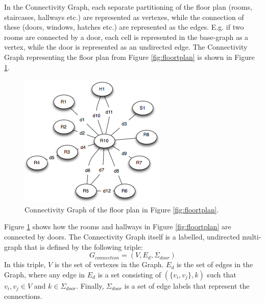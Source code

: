 In the Connectivity Graph, each separate partitioning of the floor plan (rooms, staircases, hallways etc.) are represented as vertexes, while the connection of these (doors, windows, hatches etc.) are represented as the edges.
E.g. if two rooms are connected by a door, each cell is represented in the base-graph as a vertex, while the door is represented as an undirected edge. 
The Connectivity Graph representing the floor plan from Figure \ref{fig:floortplan} is shown in Figure \ref{fig:connectivitygraph}. 
\begin{figure}[]%
\centering
\includegraphics[width=0.8\columnwidth]{images/connectivitygraph.png}%
\caption{Connectivity Graph of the floor plan in Figure \ref{fig:floortplan}.}%
\label{fig:connectivitygraph}%
\end{figure}%
Figure \ref{fig:connectivitygraph} shows how the rooms and hallways in Figure \ref{fig:floortplan} are connected by doors. 
The Connectivity Graph itself is a labelled, undirected multi-graph that is defined by the following triple: \\
\begin{equation}
G_{connection} = (V, E_d, \Sigma_{door})
\end{equation}
In this triple, $V$ is the set of vertexes in the Graph. 
$E_d$ is the set of edges in the Graph, where any edge in $E_d$ is a set consisting of $(\{v_i, v_j\}, k)$ such that $v_i, v_j \in V$ and $k \in \Sigma_{door}$.
Finally, $\Sigma_{door}$ is a set of edge labels that represent the connections. 



